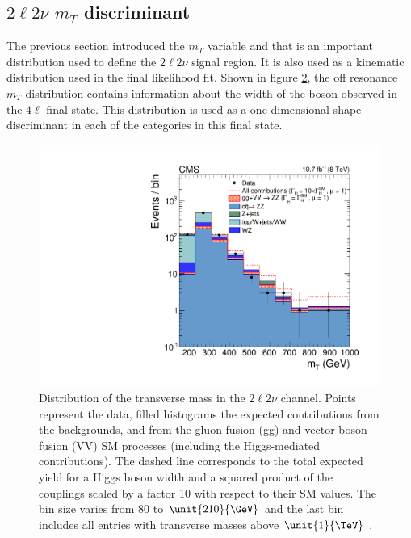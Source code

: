 \begin{figure}
{}
\label{fig:kd-discr}
\end{figure}

\subsection{$2\ell2\nu$ $m_{T}$ discriminant}
\label{sec:2l2nu_mT}

The previous section introduced the $m_{T}$ variable and that is an important distribution used to define the $2\ell2\nu$ signal region. It is also used as a kinematic distribution used in the final likelihood fit. Shown in figure \ref{fig:mtfit}, the off resonance $m_{T}$ distribution contains information about the width of the boson observed in the $4\ell$ final state. This distribution is used as a one-dimensional shape discriminant in each of the categories in this final state.


\begin{figure}[htb]
\centering
\includegraphics[width=0.45\linewidth]{HZZ_Width/fig4_new.pdf}
\caption[Distribution of the transverse mass in the $2\ell2\nu$ channel. Points represent
the data, filled histograms the expected contributions from the backgrounds, and
from the gluon fusion (gg) and vector boson fusion (VV) SM processes (including
the Higgs-mediated contributions). The dashed line corresponds to the total expected
yield for a Higgs boson width and a squared product of the couplings scaled by a
factor 10 with respect to their SM values.
The bin size varies from 80 to $\unit{210}{\GeV}$ and the last bin includes all entries with
transverse masses above $\unit{1}{\TeV}$.]{
Distribution of the transverse mass in the $2\ell2\nu$ channel. Points represent
the data, filled histograms the expected contributions from the backgrounds, and
from the gluon fusion (gg) and vector boson fusion (VV) SM processes (including
the Higgs-mediated contributions). The dashed line corresponds to the total expected
yield for a Higgs boson width and a squared product of the couplings scaled by a
factor 10 with respect to their SM values.
The bin size varies from 80 to $\unit{210}{\GeV}$ and the last bin includes all entries with
transverse masses above $\unit{1}{\TeV}$ \cite{Khachatryan:2014iha}.}
\label{fig:mtfit}
\end{figure}


